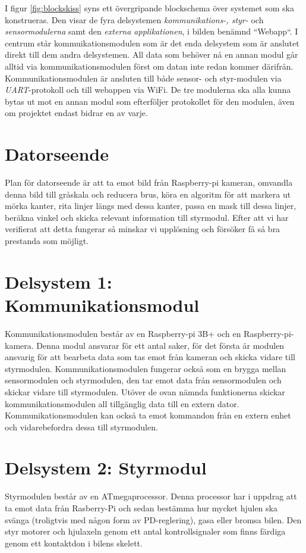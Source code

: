 \documentclass[10pt,oneside,swedish]{lips}
\begin{document}
I figur \ref{fig:blockskiss} syns ett övergripande blockschema över systemet som ska konstrueras. Den visar de fyra delsystemen \emph{kommunikations-, styr-} och \emph{sensormodulerna} samt den \emph{externa applikationen}, i bilden benämnd ``Webapp``. I centrum står kommuikationsmodulen som är det enda delsystem som är anslutet direkt till dem andra delsystemen. All data som behöver nå en annan modul går alltid via kommunikationsmodulen först om datan inte redan kommer därifrån.
Kommunikationsmodulen är ansluten till både sensor- och styr-modulen via \emph{UART}-protokoll och till webappen via WiFi. De tre modulerna ska alla kunna bytas ut mot en annan modul som efterföljer protokollet för den modulen, även om projektet endast bidrar en av varje. 

\section{Datorseende}
Plan för datorseende är att ta emot bild från Raspberry-pi kameran, omvandla denna bild till gråskala och reducera brus, köra en algoritm för att markera ut mörka kanter, rita linjer längs med dessa kanter, passa en mask till dessa linjer, beräkna vinkel och skicka relevant information till styrmodul. Efter att vi har verifierat att detta fungerar så minskar vi upplösning och försöker få så bra prestanda som möjligt.


\section{Delsystem 1: Kommunikationsmodul}
Kommunikationsmodulen består av en Raspberry-pi 3B+ och en Raspberry-pi-kamera. Denna modul ansvarar för ett antal saker, för det första är modulen ansvarig för att bearbeta data som tas emot från kameran och skicka vidare till styrmodulen. 
Kommunikationsmodulen fungerar också som en brygga mellan sensormodulen och styrmodulen, den tar emot data från sensormodulen och skickar vidare till styrmodulen.
Utöver de ovan nämnda funktionerna skickar kommunikationsmodulen all tillgänglig data till en extern dator. Kommunikationsmodulen kan också ta emot kommandon från en extern enhet och vidarebefordra dessa till styrmodulen.

\section{Delsystem 2: Styrmodul}
Styrmodulen består av en ATmegaprocessor. Denna processor har i uppdrag att ta emot data från Rasberry-Pi och sedan bestämma hur mycket hjulen ska svänga (troligtvis med någon form av PD-reglering), gasa eller bromsa bilen. Den styr motorer och hjulaxeln genom ett antal kontrollsignaler som finns färdiga genom ett kontaktdon i bilens skelett. 
\end{document}
